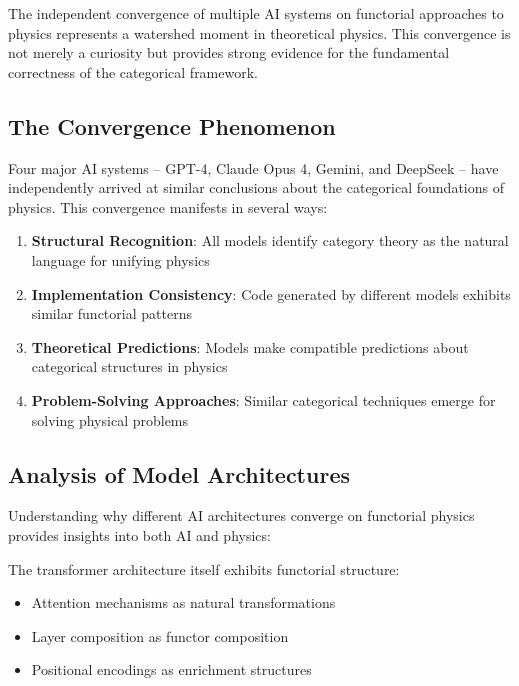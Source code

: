 The independent convergence of multiple AI systems on functorial approaches to physics represents a watershed moment in theoretical physics. This convergence is not merely a curiosity but provides strong evidence for the fundamental correctness of the categorical framework.

\subsection{The Convergence Phenomenon}

Four major AI systems -- GPT-4, Claude Opus 4, Gemini, and DeepSeek -- have independently arrived at similar conclusions about the categorical foundations of physics. This convergence manifests in several ways:

\begin{enumerate}[leftmargin=*]
\item \textbf{Structural Recognition}: All models identify category theory as the natural language for unifying physics
\item \textbf{Implementation Consistency}: Code generated by different models exhibits similar functorial patterns
\item \textbf{Theoretical Predictions}: Models make compatible predictions about categorical structures in physics
\item \textbf{Problem-Solving Approaches}: Similar categorical techniques emerge for solving physical problems
\end{enumerate}

\subsection{Analysis of Model Architectures}

Understanding why different AI architectures converge on functorial physics provides insights into both AI and physics:

\begin{definition}
The transformer architecture itself exhibits functorial structure:
\begin{itemize}
\item Attention mechanisms as natural transformations
\item Layer composition as functor composition  
\item Positional encodings as enrichment structures
\end{itemize}
\end{definition}

